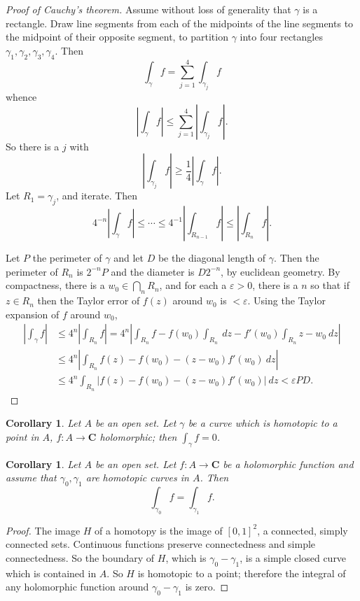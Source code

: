 \documentclass[12pt]{report}
\newcommand{\CC}{\mathbf{C}}
\newtheorem{corollary}[theorem]{Corollary}
\theoremstyle{definition}
\theoremstyle{remark}
\begin{document}
\begin{proof}[Proof of Cauchy's theorem]
Assume without loss of generality that $\gamma$ is a rectangle. Draw line segments from each of the midpoints of the line segments to the midpoint of their opposite segment, to partition $\gamma$ into four rectangles $\gamma_1, \gamma_2, \gamma_3, \gamma_4$. Then
$$\int_\gamma f = \sum_{j=1}^4 \int_{\gamma_j} f$$
whence
$$\left|\int_\gamma f\right| \leq \sum_{j=1}^4 \left|\int_{\gamma_j} f\right|.$$
So there is a $j$ with
$$\left|\int_{\gamma_j} f\right| \geq \frac{1}{4} \left|\int_\gamma f\right|.$$
Let $R_1 = \gamma_j$, and iterate. Then
$$4^{-n} \left|\int_\gamma f\right| \leq \cdots \leq 4^{-1} \left|\int_{R_{n-1}} f\right| \leq \left|\int_{R_n} f \right|.$$

Let $P$ the perimeter of $\gamma$ and let $D$ be the diagonal length of $\gamma$. Then the perimeter of $R_n$ is $2^{-n}P$ and the diameter is $D2^{-n}$, by euclidean geometry. By compactness, there is a $w_0 \in \bigcap_n R_n$, and for each a $\varepsilon > 0$, there is a $n$ so that if $z \in R_n$ then the Taylor error of $f(z)$ around $w_0$ is $< \varepsilon$. Using the Taylor expansion of $f$ around $w_0$,
\begin{align*}
\left|\int_\gamma f\right| &\leq 4^n \left|\int_{R_n} f\right|
	= 4^n \left|\int_{R_n} f - f(w_0) \int_{R_n} ~dz - f'(w_0)\int_{R_n} z - w_0 ~dz\right|\\
	&\leq 4^n \left|\int_{R_n} f(z) - f(w_0) - (z - w_0)f'(w_0) ~dz\right|\\
	&\leq 4^n \int_{R_n} |f(z) - f(w_0) - (z - w_0)f'(w_0)| ~dz < \varepsilon PD.
\end{align*}
\end{proof}
\begin{corollary}
Let $A$ be an open set. Let $\gamma$ be a curve which is homotopic to a point in $A$, $f: A \to \CC$ holomorphic; then $\int_\gamma f = 0$.
\end{corollary}
\begin{corollary}
Let $A$ be an open set. Let $f: A \to \CC$ be a holomorphic function and assume that $\gamma_0,\gamma_1$ are homotopic curves in $A$. Then
$$\int_{\gamma_0} f = \int_{\gamma_1} f.$$
\end{corollary}
\begin{proof}
The image $H$ of a homotopy is the image of $[0, 1]^2$, a connected, simply connected sets. Continuous functions preserve connectedness and simple connectedness. So the boundary of $H$, which is $\gamma_0 - \gamma_1$, is a simple closed curve which is contained in $A$. So $H$ is homotopic to a point; therefore the integral of any holomorphic function around $\gamma_0 - \gamma_1$ is zero.
\end{proof}
\end{document}
